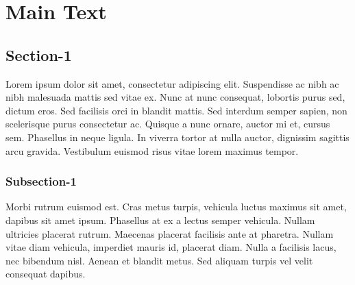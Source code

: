 \documentclass[12pt]{report}
\begin{document}
\chapter{Main Text}
\bigskip
\section{Section-1}
Lorem ipsum dolor sit amet, consectetur adipiscing elit. Suspendisse ac nibh ac nibh malesuada mattis sed vitae ex. Nunc at nunc consequat, lobortis purus sed, dictum eros. Sed facilisis orci in blandit mattis. Sed interdum semper sapien, non scelerisque purus consectetur ac. Quisque a nunc ornare, auctor mi et, cursus sem. Phasellus in neque ligula. In viverra tortor at nulla auctor, dignissim sagittis arcu gravida. Vestibulum euismod risus vitae lorem maximus tempor. \\

\subsection{Subsection-1}
Morbi rutrum euismod est. Cras metus turpis, vehicula luctus maximus sit amet, dapibus sit amet ipsum. Phasellus at ex a lectus semper vehicula. Nullam ultricies placerat rutrum. Maecenas placerat facilisis ante at pharetra. Nullam vitae diam vehicula, imperdiet mauris id, placerat diam. Nulla a facilisis lacus, nec bibendum nisl. Aenean et blandit metus. Sed aliquam turpis vel velit consequat dapibus.
\end{document}
